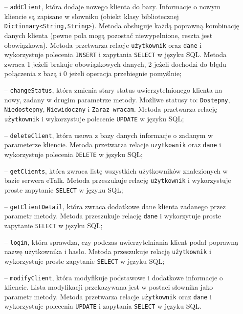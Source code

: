 \documentclass[a4paper,12pt]{article}
\begin{document}
\begin{itemize}
    \item[--] \texttt{addClient}, która dodaje nowego klienta do bazy. Informacje o nowym kliencie są zapisane w słowniku (obiekt klasy bibliotecznej \texttt{Dictionary<String,String>}). Metoda obsługuje każdą poprawną kombinację danych klienta (pewne pola mogą pozostać niewypełnione, reszta jest obowiązkowa).
        Metoda przetwarza relacje \texttt{użytkownik} oraz \texttt{dane} i wykorzystuje polecenia \texttt{INSERT} i zapytania \texttt{SELECT} w języku SQL. Metoda zwraca 1 jeżeli brakuje obowiązkowych danych, 2 jeżeli dochodzi do błędu połączenia z bazą i 0 jeżeli operacja przebiegnie pomyślnie;
    \item[--] \texttt{changeStatus}, która zmienia stary status uwierzytelnionego klienta na nowy, zadany w drugim parametrze metody. Możliwe statusy to: \texttt{Dostepny}, \texttt{Niedostepny}, \texttt{Niewidoczny} i \texttt{Zaraz wracam}. Metoda przetwarza relację \texttt{użytkownik} i wykorzystuje polecenie \texttt{UPDATE} w języku SQL;
    \item[--] \texttt{deleteClient}, która usuwa z bazy danych informacje o zadanym w parameterze kliencie.
              Metoda przetwarza relacje \texttt{uzytkownik} oraz \texttt{dane} i wykorzystuje polecenia \texttt{DELETE} w języku SQL;
    \item[--] \texttt{getClients}, która zwraca listę wszystkich użytkowników znalezionych w bazie serwera eTalk.
              Metoda przeszukuje relację \texttt{użytkownik} i wykorzystuje proste zapytanie \texttt{SELECT} w języku SQL;
    \item[--] \texttt{getClientDetail}, która zwraca dodatkowe dane klienta zadanego przez parametr metody.
              Metoda przeszukuje relację \texttt{dane} i wykorzytuje proste zapytanie \texttt{SELECT} w języku SQL;
    \item[--] \texttt{login}, która sprawdza, czy podczas uwierzytelniania klient podał poprawną nazwę użytkownika i hasło. Metoda przeszukuje relację \texttt{użytkownik} i wykorzystuje proste zapytanie \texttt{SELECT} w języku SQL;
    \item[--] \texttt{modifyClient}, która modyfikuje podstawowe i dodatkowe informacje o kliencie. Lista modyfikacji przekazywana jest w postaci słownika jako parametr metody.
        Metoda przetwarza relacje \texttt{użytkownik} oraz \texttt{dane} i wykorzystuje polecenia \texttt{UPDATE} i zapytania \texttt{SELECT} w języku SQL.
\end{itemize}
\end{document}
